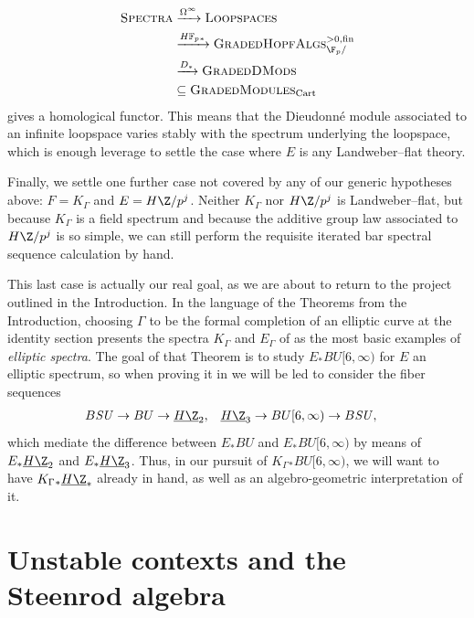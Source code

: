 \begin{description}
\begin{align*}
\CatOf{Spectra} & \xrightarrow{\Loops^\infty} \CatOf{Loopspaces} \\
& \xrightarrow{\HFp_*} \CatOf{GradedHopfAlgs}^{>0, \fin}_{\F_p/} \\
& \xrightarrow{D_*} \CatOf{GradedDMods} \\
& \subseteq \CatOf{GradedModules}_{\Cart}
\end{align*}
gives a homological functor.
This means that the Dieudonn\'e module associated to an infinite loopspace varies stably with the spectrum underlying the loopspace, which is enough leverage to settle the case where \(E\) is any Landweber--flat theory.
\item[{\Cref{CoopnsForMoravaKandHA}}] Finally, we settle one further case not covered by any of our generic hypotheses above: \(F = K_\Gamma\) and \(E = H\Z/p^j\).
Neither \(K_\Gamma\) nor \(H\Z/p^j\) is Landweber--flat, but because \(K_\Gamma\) is a field spectrum and because the additive group law associated to \(H\Z/p^j\) is so simple, we can still perform the requisite iterated bar spectral sequence calculation by hand.
\end{description}

This last case is actually our real goal, as we are about to return to the project outlined in the Introduction.
In the language of the Theorems from the Introduction, choosing \(\Gamma\) to be the formal completion of an elliptic curve at the identity section presents the spectra \(K_\Gamma\) and \(E_\Gamma\) of  as the most basic examples of \textit{elliptic spectra}.
The goal of that Theorem is to study \(E_* BU[6, \infty)\) for \(E\) an elliptic spectrum, so when proving it in  we will be led to consider the fiber sequences
\begin{align*}
B\SU \to BU & \to \OS{H\Z}{2}, & \OS{H\Z}{3} \to BU[6, \infty) & \to B\SU,
\end{align*}
which mediate the difference between \(E_* BU\) and \(E_* BU[6, \infty)\) by means of \(E_* \OS{H\Z}{2}\) and \(E_* \OS{H\Z}{3}\).
Thus, in our pursuit of \(K_\Gamma{}_* BU[6, \infty)\), we will want to have \(K_\Gamma{}_* \OS{H\Z}{*}\) already in hand, as well as an algebro-geometric interpretation of it.









\section{Unstable contexts and the Steenrod algebra}\label{UnstableContextsSection}


